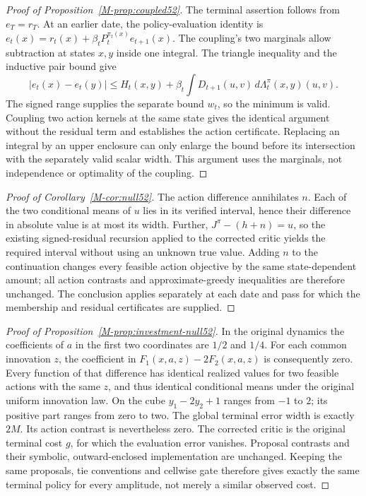 \begin{proof}[Proof of Proposition~\ref{M-prop:coupled52}]
The terminal assertion follows from $e_T=r_T$. At an earlier date, the policy-evaluation identity is
$e_t(x)=r_t(x)+\beta_tP_t^{\pi_t(x)}e_{t+1}(x)$.
The coupling's two marginals allow subtraction at states $x,y$ inside one integral. The triangle inequality and the inductive pair bound give
\[
 |e_t(x)-e_t(y)|\le H_t(x,y)+\beta_t
       \int D_{t+1}(u,v)\,d\Lambda_t^\pi(x,y)(u,v).
\]
The signed range supplies the separate bound $w_t$, so the minimum is valid. Coupling two action kernels at the same state gives the identical argument without the residual term and establishes the action certificate. Replacing an integral by an upper enclosure can only enlarge the bound before its intersection with the separately valid scalar width. This argument uses the marginals, not independence or optimality of the coupling.
\end{proof}

\begin{proof}[Proof of Corollary~\ref{M-cor:null52}]
The action difference annihilates $n$. Each of the two conditional means of $u$ lies in its verified interval, hence their difference in absolute value is at most its width. Further,
$J^\pi-(h+n)=u$, so the existing signed-residual recursion applied to the corrected critic yields the required interval without using an unknown true value. Adding $n$ to the continuation changes every feasible action objective by the same state-dependent amount; all action contrasts and approximate-greedy inequalities are therefore unchanged. The conclusion applies separately at each date and pass for which the membership and residual certificates are supplied.
\end{proof}

\begin{proof}[Proof of Proposition~\ref{M-prop:investment-null52}]
In the original dynamics the coefficients of $a$ in the first two coordinates are $1/2$ and $1/4$. For each common innovation $z$, the coefficient in $F_1(x,a,z)-2F_2(x,a,z)$ is consequently zero. Every function of that difference has identical realized values for two feasible actions with the same $z$, and thus identical conditional means under the original uniform innovation law. On the cube $y_1-2y_2+1$ ranges from $-1$ to $2$; its positive part ranges from zero to two. The global terminal error width is exactly $2M$. Its action contrast is nevertheless zero. The corrected critic is the original terminal cost $g$, for which the evaluation error vanishes. Proposal contrasts and their symbolic, outward-enclosed implementation are unchanged. Keeping the same proposals, tie conventions and cellwise gate therefore gives exactly the same terminal policy for every amplitude, not merely a similar observed cost.
\end{proof}

